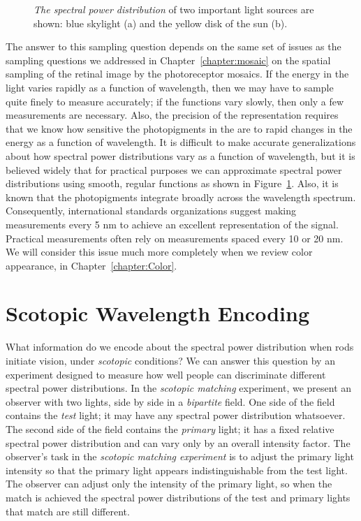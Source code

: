 \begin{figure}
\centerline {
}
\caption[Spectral Power Distributions]{
{\em The spectral power distribution}
of two important light sources are shown:
blue skylight (a) and the yellow disk of the sun (b).
}
\label{f3:spectra}
\end{figure}
The answer to this sampling question depends on the same
set of issues as the sampling questions
we addressed in Chapter~\ref{chapter:mosaic} on the
spatial sampling of the retinal image by the photoreceptor mosaics.
If the energy in the light varies rapidly as a function
of wavelength, then 
we may have to sample quite finely to measure accurately;
if the functions vary slowly, then only a few
measurements are necessary.
Also, the precision of the representation
requires that we know how sensitive the photopigments
in the are to rapid changes in the energy as a function
of wavelength.
It is difficult to make accurate generalizations about
how spectral power distributions vary as a function of wavelength,
but it is believed widely that for practical purposes
we can approximate
spectral power distributions
using smooth, regular functions as shown
in Figure~\ref{f3:spectra}.
Also, it is known that the photopigments integrate broadly
across the wavelength spectrum.
Consequently, international standards organizations suggest making
measurements every 5 nm to achieve an excellent representation
of the signal.
Practical measurements often rely on measurements spaced
every 10 or 20 nm.
We will consider
this issue much more completely
when we review color appearance, in Chapter~\ref{chapter:Color}.

\section{Scotopic Wavelength Encoding}

What information do we encode about
the spectral power distribution
when rods initiate vision, under {\em scotopic} conditions?
We can answer this question by an experiment designed
to measure how well people
can discriminate different spectral power distributions.
In the {\em scotopic matching} experiment, we present an
observer with two lights, side by side in a {\em bipartite} field.
One side of the field contains the {\em test} light;
it may have any spectral power distribution whatsoever.
The second side of the field contains the {\em primary} light;
it has a fixed relative spectral power distribution
and can vary only by an overall intensity factor.
The observer's task in the {\em scotopic matching experiment} is
to adjust the primary light intensity
so that the primary light appears indistinguishable from the test light.
The observer can adjust only the intensity of the primary light,
so when the match is achieved the spectral power distributions of the
test and primary lights that match are still different.

